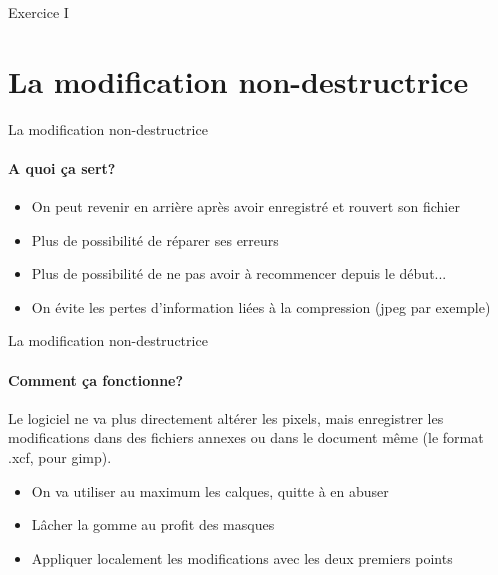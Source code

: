 \documentclass[10pt,svgnames,usenames,table]{beamer}
\begin{document}
\begin{frame}{Exercice I}
\begin{overprint}
\begin{enumerate}
	\end{enumerate}
	\end{overprint}
\end{frame}



\section{La modification non-destructrice}
	\begin{frame}{La modification non-destructrice}
	\framesubtitle{A quoi ça sert?}
	\begin{itemize}
		\item On peut revenir en arrière après avoir enregistré et rouvert son fichier
		\item Plus de possibilité de réparer ses erreurs
		\item Plus de possibilité de ne pas avoir à recommencer depuis le début...
		\item On évite les pertes d'information liées à la compression (jpeg par exemple)
	\end{itemize}	
	\end{frame}

	\begin{frame}{La modification non-destructrice}
	\framesubtitle{Comment ça fonctionne?}
	Le logiciel ne va plus directement altérer les pixels, mais enregistrer les modifications dans des fichiers annexes ou dans le document même (le format .xcf, pour gimp).
	\begin{itemize}
	\item On va utiliser au maximum les calques, quitte à en abuser
	\item Lâcher la gomme au profit des masques
	\item Appliquer localement les modifications avec les deux premiers points
	\end{itemize}	
	\end{frame}
\end{document}

